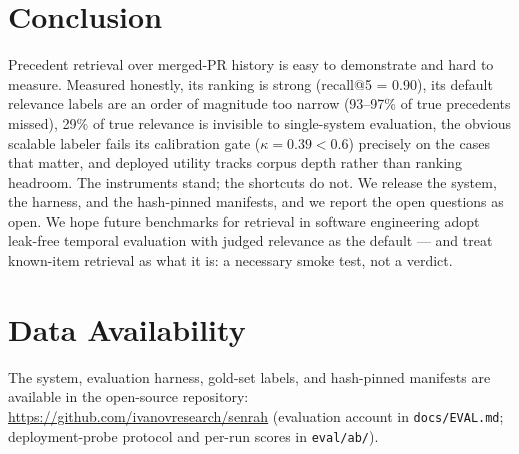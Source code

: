 \documentclass[sigconf,nonacm]{acmart}
\begin{document}
\section{Conclusion}
\label{sec:conclusion}

Precedent retrieval over merged-PR history is easy to demonstrate and hard
to measure. Measured honestly, its ranking is strong (recall@5 = 0.90),
its default relevance labels are an order of magnitude too narrow
(93--97\% of true precedents missed), 29\% of true relevance is invisible
to single-system evaluation, the obvious scalable labeler fails its
calibration gate ($\kappa = 0.39 < 0.6$) precisely on the cases that
matter, and deployed utility tracks corpus depth rather than ranking
headroom. The instruments stand; the shortcuts do not. We release the
system, the harness, and the hash-pinned manifests, and we report the open
questions as open. We hope future benchmarks for retrieval in software
engineering adopt leak-free temporal evaluation with judged relevance as
the default --- and treat known-item retrieval as what it is: a necessary
smoke test, not a verdict.

\section*{Data Availability}
The system, evaluation harness, gold-set labels, and hash-pinned manifests
are available in the open-source repository:
\url{https://github.com/ivanovresearch/senrah} (evaluation account in
\texttt{docs/EVAL.md}; deployment-probe protocol and per-run scores in
\texttt{eval/ab/}).



\end{document}
